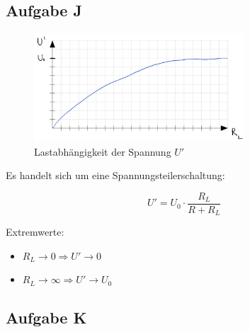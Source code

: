 \subsection*{Aufgabe J}

\begin{figure}[H]
    \centering
    \includegraphics[width=0.7\textwidth]{Voraufgaben/J.jpg}
    \caption{Lastabhängigkeit der Spannung $U'$}
    \label{fig:VA_J}
\end{figure}

Es handelt sich um eine Spannungsteilerschaltung:

\[
U' = U_0 \cdot \frac{R_L}{R + R_L}
\]

Extremwerte:

\begin{itemize}
    \item $R_L \rightarrow 0 \Rightarrow U' \rightarrow 0$
    \item $R_L \rightarrow \infty \Rightarrow U' \rightarrow U_0$
\end{itemize}


\subsection*{Aufgabe K}